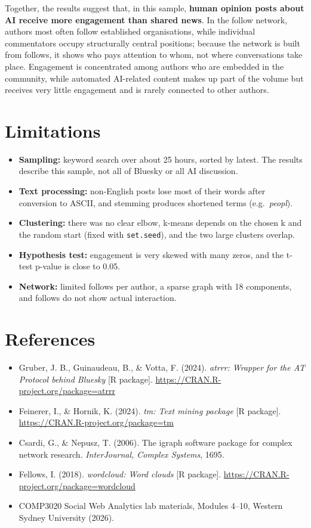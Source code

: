 \documentclass[
  10pt,
]{article}
\providecommand{\tightlist}{%
  \setlength{\itemsep}{0pt}\setlength{\parskip}{0pt}}
\begin{document}
Together, the results suggest that, in this sample, \textbf{human
opinion posts about AI receive more engagement than shared news}. In the
follow network, authors most often follow established organisations,
while individual commentators occupy structurally central positions;
because the network is built from follows, it shows who pays attention
to whom, not where conversations take place. Engagement is concentrated
among authors who are embedded in the community, while automated
AI-related content makes up part of the volume but receives very little
engagement and is rarely connected to other authors.

\section{Limitations}\label{limitations}

\begin{itemize}
\tightlist
\item
  \textbf{Sampling:} keyword search over about 25 hours, sorted by
  latest. The results describe this sample, not all of Bluesky or all AI
  discussion.
\item
  \textbf{Text processing:} non-English posts lose most of their words
  after conversion to ASCII, and stemming produces shortened terms
  (e.g.~\emph{peopl}).
\item
  \textbf{Clustering:} there was no clear elbow, k-means depends on the
  chosen k and the random start (fixed with \texttt{set.seed}), and the
  two large clusters overlap.
\item
  \textbf{Hypothesis test:} engagement is very skewed with many zeros,
  and the t-test p-value is close to 0.05.
\item
  \textbf{Network:} limited follows per author, a sparse graph with 18
  components, and follows do not show actual interaction.
\end{itemize}

\section{References}\label{references}

\begin{itemize}
\tightlist
\item
  Gruber, J. B., Guinaudeau, B., \& Votta, F. (2024). \emph{atrrr:
  Wrapper for the AT Protocol behind Bluesky} {[}R package{]}.
  \url{https://CRAN.R-project.org/package=atrrr}
\item
  Feinerer, I., \& Hornik, K. (2024). \emph{tm: Text mining package}
  {[}R package{]}. \url{https://CRAN.R-project.org/package=tm}
\item
  Csardi, G., \& Nepusz, T. (2006). The igraph software package for
  complex network research. \emph{InterJournal, Complex Systems}, 1695.
\item
  Fellows, I. (2018). \emph{wordcloud: Word clouds} {[}R package{]}.
  \url{https://CRAN.R-project.org/package=wordcloud}
\item
  COMP3020 Social Web Analytics lab materials, Modules 4--10, Western
  Sydney University (2026).
\end{itemize}
\end{document}
